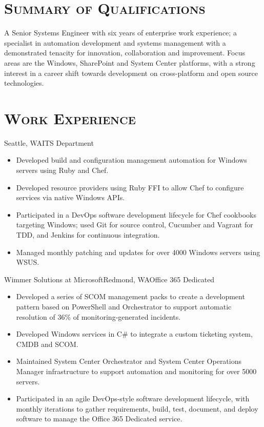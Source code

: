 \documentclass[11pt,letter,roman]{moderncv}
\begin{document}
\makecvtitle{}
\vspace{-\baselineskip}

\section{\textsc{Summary of Qualifications}}
A Senior Systems Engineer with six years of enterprise work
experience; a specialist in automation development and systems management
with a demonstrated tenacity for innovation, collaboration and improvement.
Focus areas are the Windows, SharePoint and System Center platforms,
with a strong interest in a career shift towards development on cross-platform and
open source technologies.

\section{\textsc{Work Experience}}
{Seattle, WA}{ITS Department}{%
  \begin{itemize}
    \item Developed build and configuration management automation for Windows
      servers using Ruby and Chef.
    \item Developed resource providers using Ruby FFI to allow Chef to
      configure services via native Windows APIs.
    \item Participated in a DevOps software development lifecycle for Chef
      cookbooks targeting Windows; used Git for source control, Cucumber and
      Vagrant for TDD, and Jenkins for continuous integration.
    \item Managed monthly patching and updates for over 4000 Windows servers
      using WSUS.
  \end{itemize}
}
{Wimmer Solutions at Microsoft}{Redmond, WA}{Office 365 Dedicated}{%
  \begin{itemize}
    \item Developed a series of SCOM management packs to create a development
      pattern based on PowerShell and Orchestrator to support automatic
      resolution of 36\% of monitoring-generated incidents.
    \item Developed Windows services in C\# to integrate a custom ticketing
      system, CMDB and SCOM.
    \item Maintained System Center Orchestrator and System Center Operations
      Manager infrastructure to support automation and monitoring for over
      5000 servers.
    \item Participated in an agile DevOps-style software development
      lifecycle, with monthly iterations to gather requirements, build, test,
      document, and deploy software to manage the Office 365 Dedicated service.
  \end{itemize}
}
\end{document}
